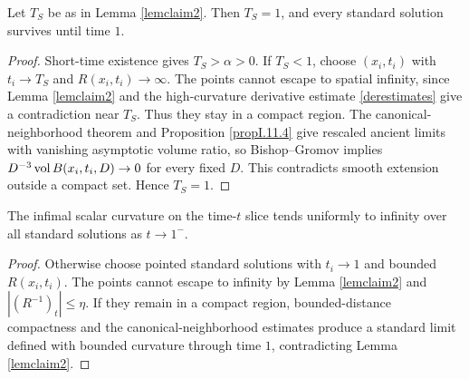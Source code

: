 \begin{lemma}
  \label{lem:kl-blow-up-time-standard-solution-standard-solutions-lemma}
 \label{lemclaim4}
Let $T_S$ be as in Lemma \ref{lemclaim2}. Then $T_S=1$, and every standard
solution survives until time $1$.
\end{lemma}
\begin{proof}
\sketch Short-time existence gives $T_S>\alpha>0$. If $T_S<1$, choose
$(x_i,t_i)$ with $t_i\to T_S$ and $R(x_i,t_i)\to\infty$. The points cannot
escape to spatial infinity, since Lemma \ref{lemclaim2} and the high-curvature
derivative estimate \eqref{derestimates} give a contradiction near $T_S$.
Thus they stay in a compact region. The canonical-neighborhood theorem and
Proposition \ref{propI.11.4} give rescaled ancient limits with vanishing
asymptotic volume ratio, so Bishop--Gromov implies
$D^{-3}\operatorname{vol} B(x_i,t_i,D)\to0$ for every fixed $D$. This contradicts smooth
extension outside a compact set. Hence $T_S=1$.
\end{proof}

\begin{lemma}
  \label{lem:kl-blow-up-time-standard-solution-standard-solutions-lemma-3}
 \label{scalarblowup}
The infimal scalar curvature on the time-$t$ slice tends uniformly to infinity
over all standard solutions as $t\to1^-$.
\end{lemma}
\begin{proof}
\sketch Otherwise choose pointed standard solutions with $t_i\to1$ and bounded
$R(x_i,t_i)$. The points cannot escape to infinity by Lemma \ref{lemclaim2} and
$|(R^{-1})_t|\leq\eta$. If they remain in a compact region, bounded-distance
compactness and the canonical-neighborhood estimates produce a standard limit
defined with bounded curvature through time $1$, contradicting Lemma
\ref{lemclaim2}.
\end{proof}


